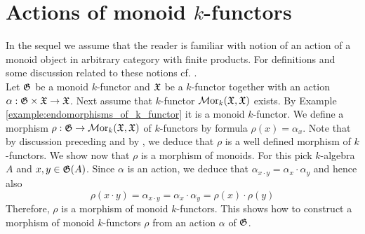 \section{Actions of monoid $k$-functors}\label{section:actions_of_monoid_k_functors}
\noindent
In the sequel we assume that the reader is familiar with notion of an action of a monoid object in arbitrary category with finite products. For definitions and some discussion related to these notions cf. {\cite[pages 5]{Maclane}}.\\
Let ${\mathfrak G}$ be a monoid $k$-functor and ${\mathfrak X}$ be a $k$-functor together with an action $\alpha:{\mathfrak G}\times {\mathfrak X} \rightarrow {\mathfrak X}$. Next assume that $k$-functor $\mathcal{M}\mathrm{or}_k({\mathfrak X},{\mathfrak X})$ exists. By Example \ref{example:endomorphisms_of_k_functor} it is a monoid $k$-functor. We define a morphism $\rho:{\mathfrak G}\rightarrow \mathcal{M}\mathrm{or}_k({\mathfrak X},{\mathfrak X})$ of $k$-functors by formula $\rho(x) = \alpha_x$. Note that by discussion preceding {\cite[Theorem 2.7]{kfunctors}} and by {\cite[Corollary 2.9]{kfunctors}}, we deduce that $\rho$ is a well defined morphism of $k$-functors. We show now that $\rho$ is a morphism of monoids. For this pick $k$-algebra $A$ and $x, y\in {\mathfrak G}(A)$. Since $\alpha$ is an action, we deduce that $\alpha_{x \cdot y} = \alpha_x \cdot \alpha_y$ and hence also
$$\rho(x\cdot y) = \alpha_{x \cdot y} = \alpha_x\cdot \alpha_y = \rho(x)\cdot \rho(y)$$
Therefore, $\rho$ is a morphism of monoid $k$-functors. This shows how to construct a morphism of monoid $k$-functors $\rho$ from an action $\alpha$ of ${\mathfrak G}$.

